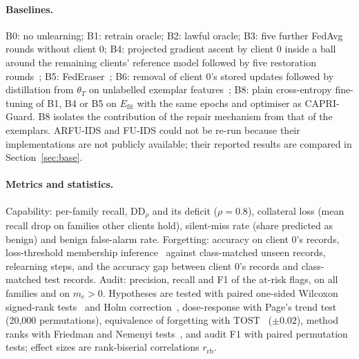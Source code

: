 \documentclass[pdflatex,sn-mathphys-num,iicol]{sn-jnl}
\newcommand{\Efit}{E_{\mathrm{fit}}}
\newcommand{\DD}{\mathrm{DD}_{\rho}}
\begin{document}
\paragraph{Baselines.} B0: no unlearning; B1: retrain oracle; B2: lawful oracle; B3: five further FedAvg rounds without client 0; B4: projected gradient ascent by client 0 inside a ball around the remaining clients' reference model followed by five restoration rounds~\cite{halimi2022,kwon2026}; B5: FedEraser~\cite{liu2021federaser}; B6: removal of client 0's stored updates followed by distillation from $\theta_T$ on unlabelled exemplar features~\cite{wu2022distill}; B8: plain cross-entropy fine-tuning of B1, B4 or B5 on $\Efit$ with the same epochs and optimiser as CAPRI-Guard. B8 isolates the contribution of the repair mechanism from that of the exemplars. ARFU-IDS and FU-IDS could not be re-run because their implementations are not publicly available; their reported results are compared in Section~\ref{sec:base}.

\paragraph{Metrics and statistics.} Capability: per-family recall, $\DD$ and its deficit ($\rho=0.8$), collateral loss (mean recall drop on families other clients hold), silent-miss rate (share predicted as benign) and benign false-alarm rate. Forgetting: accuracy on client 0's records, loss-threshold membership inference~\cite{yeom2018} against class-matched unseen records, relearning steps, and the accuracy gap between client 0's records and class-matched test records. Audit: precision, recall and F1 of the at-risk flags, on all families and on $m_c>0$. Hypotheses are tested with paired one-sided Wilcoxon signed-rank tests~\cite{wilcoxon1945} and Holm correction~\cite{holm1979}, dose-response with Page's trend test~\cite{page1963} (20{,}000 permutations), equivalence of forgetting with TOST~\cite{schuirmann1987} ($\pm0.02$), method ranks with Friedman and Nemenyi tests~\cite{friedman1937,demsar2006}, and audit F1 with paired permutation tests; effect sizes are rank-biserial correlations $r_{\mathrm{rb}}$.
\end{document}
